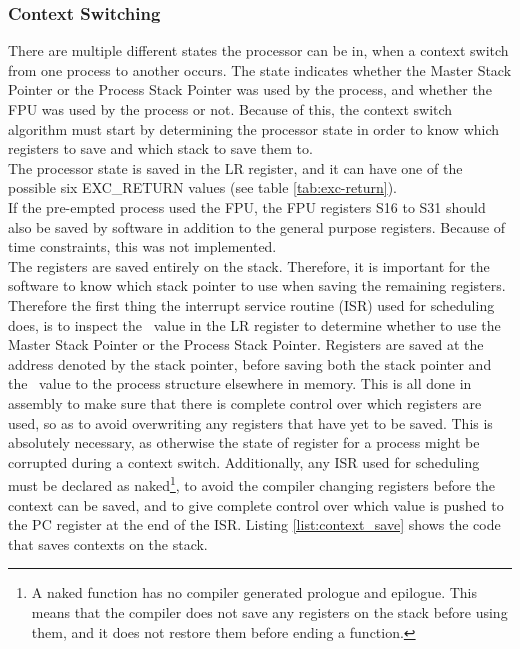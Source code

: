 \subsubsection{Context Switching}
There are multiple different states the processor can be in, when a context
switch from one process to another occurs. The state indicates whether the
Master Stack Pointer or the Process Stack Pointer was used by the process,
and whether the FPU was used by the process or not. Because of this, the context
switch algorithm must start by determining the processor state in order to know
which registers
to save and which stack to save them to.\\
The processor state is saved in the LR register, and it can have one of
the possible six EXC\_RETURN values (see table \ref{tab:exc-return}).\\
If the pre-empted process used the FPU, the FPU registers S16 to S31
should also be saved by software in addition to the general purpose registers.
Because of time constraints, this was not implemented.\\
The registers are saved entirely on the stack. Therefore, it is important for
the software to know which
stack pointer to use when saving the remaining registers. Therefore the first
thing the interrupt service routine (ISR) used for scheduling does, is to inspect
the \excreturn\ value in the LR register to determine whether to use the
Master Stack Pointer or the Process Stack Pointer.
Registers are saved at the address denoted by the stack pointer,
before saving both the stack pointer and
the \excreturn\ value to the process structure elsewhere in memory.
This is all
done in assembly to make sure that there is complete control over which
registers are used, so as to avoid overwriting any registers that have yet to be
saved. This is absolutely necessary, as otherwise the state of register for a
process might be corrupted during a context switch. Additionally, any ISR used
for scheduling must be declared as naked\footnote{A naked function has no
compiler generated prologue and epilogue. This means that the compiler does not
save any registers on the stack before using them, and it does not restore them
before ending a function.}, to avoid the compiler changing registers before the
context can be saved, and to give complete control over which value is pushed to
the PC register at the end of the ISR. Listing \ref{list:context_save} shows the
code that saves contexts on the stack.\\
